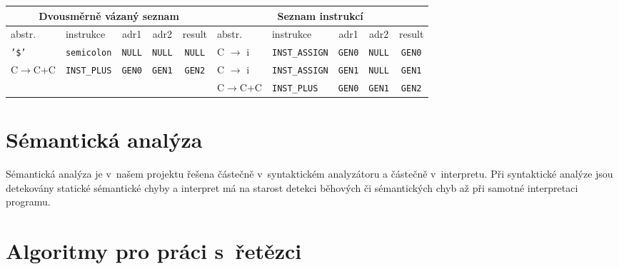 \documentclass[12pt,a4paper,titlepage,final]{article}
\begin{document}
    \begin{small}
      \noindent
      \begin{tabular}{|l|l|c|c|c||l|l|c|c|c|}

        \multicolumn{5}{c}{Dvousměrně vázaný seznam} &
        \multicolumn{5}{c}{Seznam instrukcí} \\

        \hline

        abstr. & instrukce & adr1 & adr2 & result &
        abstr. & instrukce & adr1 & adr2 & result \\

        \hline

        \texttt{'\$'} & \texttt{semicolon} & \texttt{NULL} & \texttt{NULL} &
        \texttt{NULL} & C $\rightarrow$ i & \texttt{INST\_ASSIGN} &
        \texttt{GEN0} & \texttt{NULL} & \texttt{GEN0} \\

        C$\rightarrow$C+C & \texttt{INST\_PLUS} & \texttt{GEN0} &
        \texttt{GEN1} & \texttt{GEN2} & C $\rightarrow$ i &
        \texttt{INST\_ASSIGN} & \texttt{GEN1} & \texttt{NULL} &
        \texttt{GEN1} \\

        & & & & & C$\rightarrow$C+C & \texttt{INST\_PLUS} & \texttt{GEN0} &
        \texttt{GEN1} & \texttt{GEN2} \\

        \hline

      \end{tabular}
    \end{small}

  \section{Sémantická analýza} \label{semanticka-analyza}

    Sémantická analýza je v~našem projektu řešena částečně v~syntaktickém
    analyzátoru a částečně v~interpretu. Při syntaktické analýze jsou
    detekovány statické sémantické chyby a interpret má na starost detekci
    běhových či sémantických chyb až při samotné interpretaci programu.

  \section{Algoritmy pro práci s~řetězci} \label{algoritmy}
\end{document}

